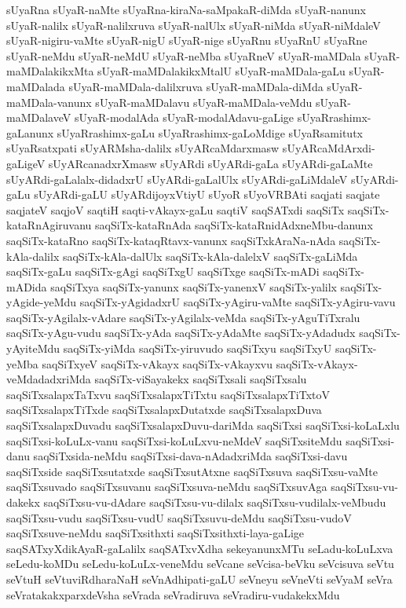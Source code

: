 {sUyaRna
sUyaR-naMte
sUyaRna-kiraNa-saMpakaR-diMda
sUyaR-nanunx
sUyaR-nalilx
sUyaR-nalilxruva
sUyaR-nalUlx
sUyaR-niMda
sUyaR-niMdaleV
sUyaR-nigiru-vaMte
sUyaR-nigU
sUyaR-nige
sUyaRnu
sUyaRnU
sUyaRne
sUyaR-neMdu
sUyaR-neMdU
sUyaR-neMba
sUyaRneV
sUyaR-maMDala
sUyaR-maMDalakikxMta
sUyaR-maMDalakikxMtalU
sUyaR-maMDala-gaLu
sUyaR-maMDalada
sUyaR-maMDala-dalilxruva
sUyaR-maMDala-diMda
sUyaR-maMDala-vanunx
sUyaR-maMDalavu
sUyaR-maMDala-veMdu
sUyaR-maMDalaveV
sUyaR-modalAda
sUyaR-modalAdavu-gaLige
sUyaRrashimx-gaLanunx
sUyaRrashimx-gaLu
sUyaRrashimx-gaLoMdige
sUyaRsamitutx
sUyaRsatxpati
sUyARMsha-dalilx
sUyARcaMdarxmasw
sUyARcaMdArxdi-gaLigeV
sUyARcanadxrXmasw
sUyARdi
sUyARdi-gaLa
sUyARdi-gaLaMte
sUyARdi-gaLalalx-didadxrU
sUyARdi-gaLalUlx
sUyARdi-gaLiMdaleV
sUyARdi-gaLu
sUyARdi-gaLU
sUyARdijoyxVtiyU
sUyoR
sUyoVRBAti
saqjati
saqjate
saqjateV
saqjoV
saqtiH
saqti-vAkayx-gaLu
saqtiV
saqSATxdi
saqSiTx
saqSiTx-kataRnAgiruvanu
saqSiTx-kataRnAda
saqSiTx-kataRnidAdxneMbu-danunx
saqSiTx-kataRno
saqSiTx-kataqRtavx-vanunx
saqSiTxkAraNa-nAda
saqSiTx-kAla-dalilx
saqSiTx-kAla-dalUlx
saqSiTx-kAla-dalelxV
saqSiTx-gaLiMda
saqSiTx-gaLu
saqSiTx-gAgi
saqSiTxgU
saqSiTxge
saqSiTx-mADi
saqSiTx-mADida
saqSiTxya
saqSiTx-yanunx
saqSiTx-yanenxV
saqSiTx-yalilx
saqSiTx-yAgide-yeMdu
saqSiTx-yAgidadxrU
saqSiTx-yAgiru-vaMte
saqSiTx-yAgiru-vavu
saqSiTx-yAgilalx-vAdare
saqSiTx-yAgilalx-veMda
saqSiTx-yAguTiTxralu
saqSiTx-yAgu-vudu
saqSiTx-yAda
saqSiTx-yAdaMte
saqSiTx-yAdadudx
saqSiTx-yAyiteMdu
saqSiTx-yiMda
saqSiTx-yiruvudo
saqSiTxyu
saqSiTxyU
saqSiTx-yeMba
saqSiTxyeV
saqSiTx-vAkayx
saqSiTx-vAkayxvu
saqSiTx-vAkayx-veMdadadxriMda
saqSiTx-viSayakekx
saqSiTxsali
saqSiTxsalu
saqSiTxsalapxTaTxvu
saqSiTxsalapxTiTxtu
saqSiTxsalapxTiTxtoV
saqSiTxsalapxTiTxde
saqSiTxsalapxDutatxde
saqSiTxsalapxDuva
saqSiTxsalapxDuvadu
saqSiTxsalapxDuvu-dariMda
saqSiTxsi
saqSiTxsi-koLaLxlu
saqSiTxsi-koLuLx-vanu
saqSiTxsi-koLuLxvu-neMdeV
saqSiTxsiteMdu
saqSiTxsi-danu
saqSiTxsida-neMdu
saqSiTxsi-dava-nAdadxriMda
saqSiTxsi-davu
saqSiTxside
saqSiTxsutatxde
saqSiTxsutAtxne
saqSiTxsuva
saqSiTxsu-vaMte
saqSiTxsuvado
saqSiTxsuvanu
saqSiTxsuva-neMdu
saqSiTxsuvAga
saqSiTxsu-vu-dakekx
saqSiTxsu-vu-dAdare
saqSiTxsu-vu-dilalx
saqSiTxsu-vudilalx-veMbudu
saqSiTxsu-vudu
saqSiTxsu-vudU
saqSiTxsuvu-deMdu
saqSiTxsu-vudoV
saqSiTxsuve-neMdu
saqSiTxsithxti
saqSiTxsithxti-laya-gaLige
saqSATxyXdikAyaR-gaLalilx
saqSATxvXdha
sekeyanunxMTu
seLadu-koLuLxva
seLedu-koMDu
seLedu-koLuLx-veneMdu
seVcane
seVcisa-beVku
seVcisuva
seVtu
seVtuH
seVtuviRdharaNaH
seVnAdhipati-gaLU
seVneyu
seVneVti
seVyaM
seVra
seVratakakxparxdeVsha
seVrada
seVradiruva
seVradiru-vudakekxMdu
}

